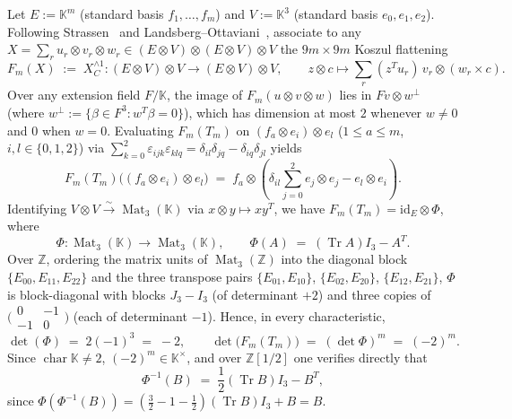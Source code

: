 \documentclass[11pt,reqno]{amsart}
\theoremstyle{definition}
\theoremstyle{remark}
\numberwithin{equation}{section}
\newcommand{\KK}{\mathbb{K}}
\newcommand{\ZZ}{\mathbb{Z}}
\DeclareMathOperator{\Mat}{Mat}
\DeclareMathOperator{\Tr}{Tr}
\DeclareMathOperator{\chr}{char}
\begin{document}
Let $E := \KK^m$ (standard basis $f_1, \dots, f_m$) and $V := \KK^3$ (standard basis $e_0, e_1, e_2$). Following Strassen~\cite{Strassen1983} and Landsberg--Ottaviani~\cite{LandsbergOttaviani2013}, associate to any $X = \sum_r u_r \otimes v_r \otimes w_r \in (E \otimes V) \otimes (E \otimes V) \otimes V$ the $9m \times 9m$ Koszul flattening
\begin{equation}\label{eq:koszul-def}
  F_m(X) \;:=\; X_C^{\wedge 1} : (E \otimes V) \otimes V \longrightarrow (E \otimes V) \otimes V, \qquad
  z \otimes c \longmapsto \sum_r (z^T u_r)\, v_r \otimes (w_r \times c).
\end{equation}
Over any extension field $F/\KK$, the image of $F_m(u \otimes v \otimes w)$ lies in $F v \otimes w^\perp$ (where $w^\perp := \{\beta \in F^3 : w^T \beta = 0\}$), which has dimension at most $2$ whenever $w \neq 0$ and $0$ when $w = 0$. Evaluating $F_m(T_m)$ on $(f_a \otimes e_i) \otimes e_l$ ($1 \le a \le m$, $i, l \in \{0, 1, 2\}$) via $\sum_{k=0}^2 \varepsilon_{ijk}\varepsilon_{klq} = \delta_{il}\delta_{jq} - \delta_{iq}\delta_{jl}$ yields
\[
  F_m(T_m)\bigl((f_a \otimes e_i) \otimes e_l\bigr)
  \;=\; f_a \otimes \left(\delta_{il}\sum_{j=0}^2 e_j \otimes e_j - e_l \otimes e_i\right).
\]
Identifying $V \otimes V \xrightarrow{\sim} \Mat_3(\KK)$ via $x \otimes y \mapsto x y^T$, we have $F_m(T_m) = \mathrm{id}_E \otimes \Phi$, where
\begin{equation}\label{eq:phi-def}
  \Phi : \Mat_3(\KK) \longrightarrow \Mat_3(\KK), \qquad \Phi(A) \;=\; (\Tr A) I_3 - A^T.
\end{equation}
Over $\ZZ$, ordering the matrix units of $\Mat_3(\ZZ)$ into the diagonal block $\{E_{00}, E_{11}, E_{22}\}$ and the three transpose pairs $\{E_{01}, E_{10}\}$, $\{E_{02}, E_{20}\}$, $\{E_{12}, E_{21}\}$, $\Phi$ is block-diagonal with blocks $J_3 - I_3$ (of determinant $+2$) and three copies of $\bigl(\begin{smallmatrix} 0 & -1 \\ -1 & 0 \end{smallmatrix}\bigr)$ (each of determinant $-1$). Hence, in every characteristic,
\begin{equation}\label{eq:det-koszul-m}
  \det(\Phi) \;=\; 2(-1)^3 \;=\; -2, \qquad
  \det\bigl(F_m(T_m)\bigr) \;=\; (\det\Phi)^m \;=\; (-2)^m.
\end{equation}
Since $\chr\KK \neq 2$, $(-2)^m \in \KK^\times$, and over $\ZZ[1/2]$ one verifies directly that
\begin{equation}\label{eq:phi-inv}
  \Phi^{-1}(B) \;=\; \frac{1}{2}(\Tr B) I_3 - B^T,
\end{equation}
since $\Phi(\Phi^{-1}(B)) = (\frac{3}{2} - 1 - \frac{1}{2})(\Tr B)I_3 + B = B$.
\end{document}
